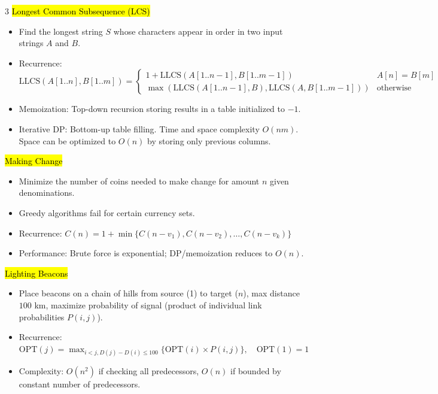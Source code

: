 \documentclass[letterpaper]{article}
\begin{document}
\begin{multicols*}{3}
    \hl{Longest Common Subsequence (LCS)}
    \begin{itemize}
        \item Find the longest string $S$ whose characters appear in order in two input strings $A$ and $B$.
        \item Recurrence:
              $
                  \text{LLCS}(A[1..n], B[1..m]) =
                  \begin{cases}
                      1 + \text{LLCS}(A[1..n-1], B[1..m-1])                    & A[n] = B[m]      \\
                      \max(\text{LLCS}(A[1..n-1],B), \text{LLCS}(A,B[1..m-1])) & \text{otherwise}
                  \end{cases}
              $
        \item Memoization: Top-down recursion storing results in a table initialized to $-1$.
        \item Iterative DP: Bottom-up table filling. Time and space complexity $O(nm)$. Space can be optimized to $O(n)$ by storing only previous columns.
    \end{itemize}

    \hl{Making Change}
    \begin{itemize}
        \item Minimize the number of coins needed to make change for amount $n$ given denominations.
        \item Greedy algorithms fail for certain currency sets.
        \item Recurrence:
              $
                  C(n) = 1 + \min \{ C(n-v_1), C(n-v_2), \dots, C(n-v_k) \}
              $
        \item Performance: Brute force is exponential; DP/memoization reduces to $O(n)$.
    \end{itemize}

    \hl{Lighting Beacons}
    \begin{itemize}
        \item Place beacons on a chain of hills from source (1) to target ($n$), max distance $100$ km, maximize probability of signal (product of individual link probabilities $P(i,j)$).
        \item Recurrence:
              $
                  \text{OPT}(j) = \max_{i<j, D(j)-D(i)\le 100} \{\text{OPT}(i) \times P(i,j)\}, \quad \text{OPT}(1) = 1
              $
        \item Complexity: $O(n^2)$ if checking all predecessors, $O(n)$ if bounded by constant number of predecessors.
    \end{itemize}


\end{multicols*}
\end{document}
